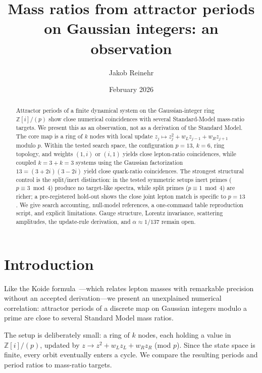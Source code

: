 \documentclass[11pt,a4paper]{article}
\title{Mass ratios from attractor periods on Gaussian integers: an observation}
\author{Jakob Reinehr}
\date{February 2026}
\begin{document}
\maketitle

\begin{abstract}
Attractor periods of a finite dynamical system on the Gaussian-integer ring $\mathbb{Z}[i]/(p)$ show close numerical coincidences with several Standard-Model mass-ratio targets. We present this as an observation, not as a derivation of the Standard Model. The core map is a ring of $k$ nodes with local update $z_j \mapsto z_j^2 + w_Lz_{j-1}+w_Rz_{j+1}$ modulo $p$. Within the tested search space, the configuration $p=13$, $k=6$, ring topology, and weights $(1,i)$ or $(i,1)$ yields close lepton-ratio coincidences, while coupled $k=3+k=3$ systems using the Gaussian factorization $13=(3+2i)(3-2i)$ yield close quark-ratio coincidences. The strongest structural control is the split/inert distinction: in the tested symmetric setups inert primes ($p \equiv 3 \bmod 4$) produce no target-like spectra, while split primes ($p \equiv 1 \bmod 4$) are richer; a pre-registered hold-out shows the close joint lepton match is specific to $p=13$. We give search accounting, null-model references, a one-command table reproduction script, and explicit limitations. Gauge structure, Lorentz invariance, scattering amplitudes, the update-rule derivation, and $\alpha \approx 1/137$ remain open.
\end{abstract}

\section{Introduction}

Like the Koide formula~\cite{koide1983}---which relates lepton masses with remarkable precision without an accepted derivation---we present an unexplained numerical correlation: attractor periods of a discrete map on Gaussian integers modulo a prime are close to several Standard Model mass ratios.

The setup is deliberately small: a ring of $k$ nodes, each holding a value in $\mathbb{Z}[i]/(p)$, updated by $z \to z^2 + w_L z_L + w_R z_R$ (mod $p$). Since the state space is finite, every orbit eventually enters a cycle. We compare the resulting periods and period ratios to mass-ratio targets.
\end{document}
